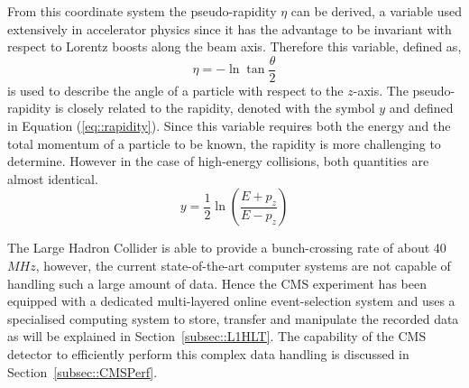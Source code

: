 From this coordinate system the pseudo-rapidity $\eta$ can be derived, a variable used extensively in accelerator physics since it has the advantage to be invariant with respect to Lorentz boosts along the beam axis. Therefore this variable, defined as,
\begin{equation} \label{eq::PseudoRapidity}
 \eta = - \ln \tan \frac{\theta}{2}
\end{equation}
is used to describe the angle of a particle with respect to the $z$-axis. The pseudo-rapidity is closely related to the rapidity, denoted with the symbol $y$ and defined in Equation (\ref{eq::rapidity}). Since this variable requires both the energy and the total momentum of a particle to be known, the rapidity is more challenging to determine. However in the case of high-energy collisions, both quantities are almost identical.
\begin{equation}\label{eq::rapidity}
 y = \frac{1}{2} \ln \left( \frac{E+p_{z}}{E - p_{z}} \right)
\end{equation}

The Large Hadron Collider is able to provide a bunch-crossing rate of about 40$\unit{MHz}$, however, the current state-of-the-art computer systems are not capable of handling such a large amount of data.
Hence the CMS experiment has been equipped with a dedicated multi-layered online event-selection system and uses a specialised computing system to store, transfer and manipulate the recorded data as will be explained in Section~\ref{subsec::L1HLT}.
The capability of the CMS detector to efficiently perform this complex data handling is discussed in Section~\ref{subsec::CMSPerf}.

